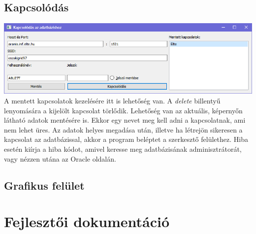 \documentclass{elteikthesis}
\begin{document}
\section{Kapcsolódás}
\includegraphics[width=1.0\textwidth]{Connect}
A mentett kapcsolatok kezelésére itt is lehetőség van. A \textit{delete} billentyű lenyomására a kijelölt kapcsolat törlődik. Lehetőség van az aktuális, képernyőn látható adatok mentésére is. Ekkor egy nevet meg kell adni a kapcsolatnak, ami nem lehet üres. Az adatok helyes megadása után, illetve ha létrejön sikeresen a kapcsolat az adatbázissal, akkor a program beléptet a szerkesztő felülethez. Hiba esetén kiírja a hiba kódot, amivel keresse meg adatbázisának adminisztrátorát, vagy nézzen utána az Oracle oldalán.

\section{Grafikus felület}

\chapter{Fejlesztői dokumentáció}
\end{document}
